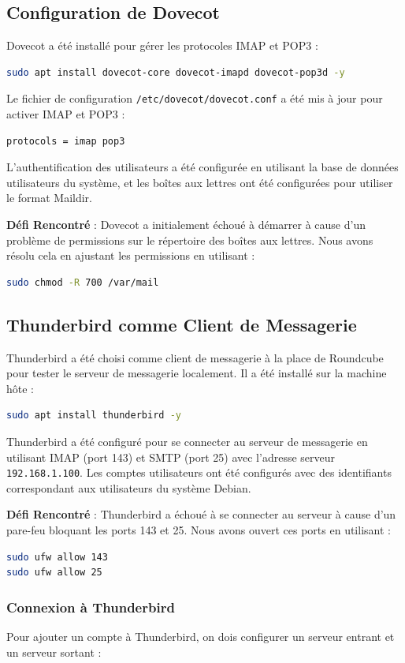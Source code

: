 \documentclass[a4paper,12pt]{article}
\begin{document}
\subsection{Configuration de Dovecot}
Dovecot a été installé pour gérer les protocoles IMAP et POP3 :
\begin{lstlisting}[language=bash]
sudo apt install dovecot-core dovecot-imapd dovecot-pop3d -y
\end{lstlisting}
Le fichier de configuration \texttt{/etc/dovecot/dovecot.conf} a été mis à jour pour activer IMAP et POP3 :
\begin{lstlisting}
protocols = imap pop3
\end{lstlisting}
L'authentification des utilisateurs a été configurée en utilisant la base de données utilisateurs du système, et les boîtes aux lettres ont été configurées pour utiliser le format Maildir.

\textbf{Défi Rencontré} : Dovecot a initialement échoué à démarrer à cause d'un problème de permissions sur le répertoire des boîtes aux lettres. Nous avons résolu cela en ajustant les permissions en utilisant :
\begin{lstlisting}[language=bash]
sudo chmod -R 700 /var/mail
\end{lstlisting}

\subsection{Thunderbird comme Client de Messagerie}
Thunderbird a été choisi comme client de messagerie à la place de Roundcube pour tester le serveur de messagerie localement. Il a été installé sur la machine hôte :
\begin{lstlisting}[language=bash]
sudo apt install thunderbird -y
\end{lstlisting}
Thunderbird a été configuré pour se connecter au serveur de messagerie en utilisant IMAP (port 143) et SMTP (port 25) avec l'adresse serveur \texttt{192.168.1.100}. Les comptes utilisateurs ont été configurés avec des identifiants correspondant aux utilisateurs du système Debian.

\textbf{Défi Rencontré} : Thunderbird a échoué à se connecter au serveur à cause d'un pare-feu bloquant les ports 143 et 25. Nous avons ouvert ces ports en utilisant :
\begin{lstlisting}[language=bash]
sudo ufw allow 143
sudo ufw allow 25
\end{lstlisting}

\subsubsection{Connexion à Thunderbird}
Pour ajouter un compte à Thunderbird, on dois configurer un serveur entrant et un serveur sortant :
\end{document}
